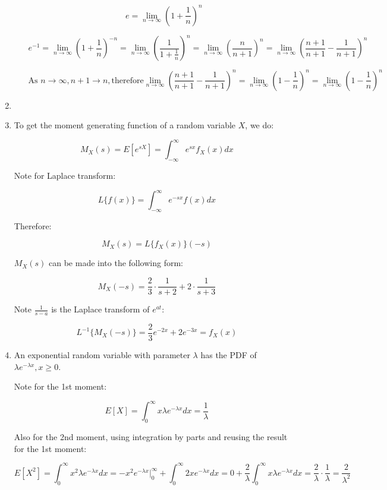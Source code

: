 \documentclass[11pt,letterpaper,titlepage]{article}
\begin{document}
\begin{enumerate}
\begin{enumerate}
        $$ e = \lim_{n\to\infty} (1 + \frac{1}{n})^n $$
        
        $$ e^{-1} = \lim_{n\to\infty} (1 + \frac{1}{n})^{-n} = \lim_{n\to\infty} (\frac{1}{1+\frac{1}{n}})^{n} = \lim_{n\to\infty} (\frac{n}{n+1})^{n} = \lim_{n\to\infty} (\frac{n+1}{n+1} - \frac{1}{n+1})^{n} $$
        
        $$ \text{As } n \to\infty, n+1 \to n, \text{therefore} \lim_{n\to\infty} (\frac{n+1}{n+1} - \frac{1}{n+1})^{n} = \lim_{n\to\infty} (1 - \frac{1}{n})^{n} = \lim_{n\to\infty} (1-\frac{1}{n})^n $$ 
        
    \end{enumerate}
    
    \item
    
    \item To get the moment generating function of a random variable $ X $, we do:
    
    $$ M_{X} (s) = E[e^{sX}] = \int_{-\infty}^{\infty} e^{s x} f_{X} (x) dx $$
    
    Note for Laplace transform:
    
    $$ L\{f(x)\}  = \int_{-\infty}^{\infty} e^{-sx} f(x) dx $$
    
    Therefore:
    
    $$ M_{X} (s) = L\{f_{X} (x)\}(-s) $$
    
    $ M_{X} (s) $ can be made into the following form:
    
    $$ M_{X} (-s) = \frac{2}{3} \cdot \frac{1}{s + 2} + 2 \cdot \frac{1}{s + 3} $$
    
    Note $ \frac{1}{s - a} $ is the Laplace transform of $ e^{at} $:
    
    $$ L^{-1} \{M_{X} (-s)\}  = \frac{2}{3} e^{-2x} + 2 e^{-3x} = f_{X}(x) $$
    
    \item An exponential random variable with parameter $ \lambda $ has the PDF of $ \lambda e^{-\lambda x}, x \geq 0 $.
    
    Note for the 1st moment:
    
    $$ E[X] = \int_{0}^{\infty} x \lambda e^{-\lambda x} dx = \frac{1}{\lambda} $$
    
    Also for the 2nd moment, using integration by parts and reusing the result for the 1st moment:
    
    $$ E[X^2] = \int_{0}^{\infty} x^2 \lambda e^{-\lambda x} dx = -x^2 e^{-\lambda x}\Big|_{0}^{\infty} + \int_{0}^{\infty} 2x e^{-\lambda x} dx = 0 + \frac{2}{\lambda} \int_{0}^{\infty} x \lambda e^{-\lambda x} dx = \frac{2}{\lambda} \cdot \frac{1}{\lambda} = \frac{2}{\lambda^2} $$


\end{enumerate}
\end{document}
